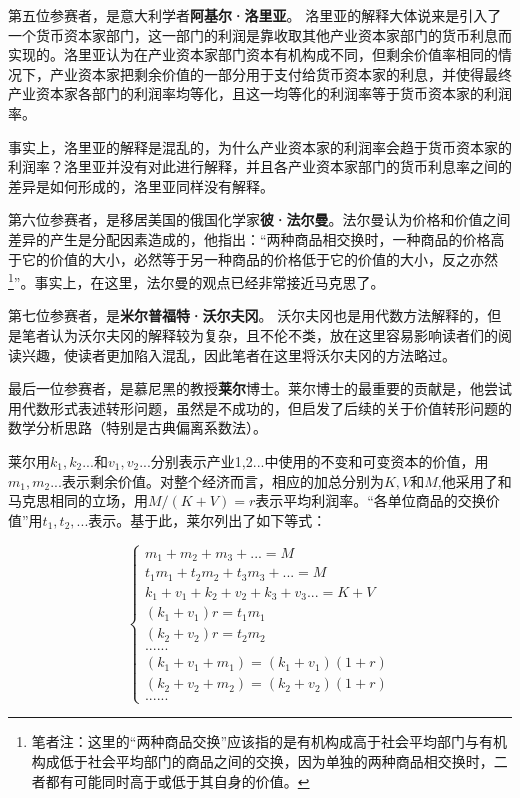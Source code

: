 \documentclass[a4paper,twoside,12pt,AutoFakeBold]{ctexart}
\begin{document}
第五位参赛者，是意大利学者\textbf{阿基尔·洛里亚}。
洛里亚的解释大体说来是引入了一个货币资本家部门，这一部门的利润是靠收取其他产业资本家部门的货币利息而实现的。洛里亚认为在产业资本家部门资本有机构成不同，但剩余价值率相同的情况下，产业资本家把剩余价值的一部分用于支付给货币资本家的利息，并使得最终产业资本家各部门的利润率均等化，且这一均等化的利润率等于货币资本家的利润率。

事实上，洛里亚的解释是混乱的，为什么产业资本家的利润率会趋于货币资本家的利润率？洛里亚并没有对此进行解释，并且各产业资本家部门的货币利息率之间的差异是如何形成的，洛里亚同样没有解释。

第六位参赛者，是移居美国的俄国化学家\textbf{彼·法尔曼}。法尔曼认为价格和价值之间差异的产生是分配因素造成的，他指出：“两种商品相交换时，一种商品的价格高于它的价值的大小，必然等于另一种商品的价格低于它的价值的大小，反之亦然\footnote{笔者注：这里的“两种商品交换”应该指的是有机构成高于社会平均部门与有机构成低于社会平均部门的商品之间的交换，因为单独的两种商品相交换时，二者都有可能同时高于或低于其自身的价值。}”。事实上，在这里，法尔曼的观点已经非常接近马克思了。

第七位参赛者，是\textbf{米尔普福特·沃尔夫冈}。
沃尔夫冈也是用代数方法解释的，但是笔者认为沃尔夫冈的解释较为复杂，且不伦不类，放在这里容易影响读者们的阅读兴趣，使读者更加陷入混乱，因此笔者在这里将沃尔夫冈的方法略过。


最后一位参赛者，是慕尼黑的教授\textbf{莱尔}博士。莱尔博士的最重要的贡献是，他尝试用代数形式表述转形问题，虽然是不成功的，但启发了后续的关于价值转形问题的数学分析思路（特别是古典偏离系数法）。

莱尔用$k_1, k_2...$和$v_1, v_2...$分别表示产业1,2...中使用的不变和可变资本的价值，用$m_1, m_2...$表示剩余价值。对整个经济而言，相应的加总分别为$K, V$和$M$,他采用了和马克思相同的立场，用$M/(K+V)=r$表示平均利润率。“各单位商品的交换价值”用$t_1, t_2,...$表示。基于此，莱尔列出了如下等式：




\begin{equation}
\begin{cases}
m_1+m_2+m_3+...=M \\
t_1m_1+t_2m_2+t_3m_3+...=M\\
k_1+v_1+k_2+v_2+k_3+v_3...=K+V\\
(k_1+v_1)r=t_1m_1\\
(k_2+v_2)r=t_2m_2\\
......\\
(k_1+v_1+m_1)=(k_1+v_1)(1+r)\\
(k_2+v_2+m_2)=(k_2+v_2)(1+r)\\
......
\end{cases}\tag{1}%
\end{equation}%
\end{document}
